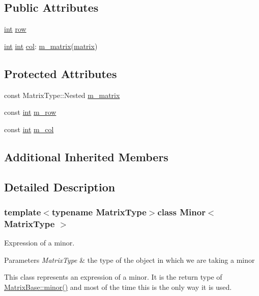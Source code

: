 \subsection*{Public Attributes}
\begin{DoxyCompactItemize}
\item 
\hyperlink{ioapi_8h_a787fa3cf048117ba7123753c1e74fcd6}{int} \hyperlink{class_minor_aed84dc350a249af6b212117b823c59df}{row}
\item 
\hyperlink{ioapi_8h_a787fa3cf048117ba7123753c1e74fcd6}{int} \hyperlink{ioapi_8h_a787fa3cf048117ba7123753c1e74fcd6}{int} \hyperlink{class_minor_abbdcf722ac69ca909b979719d920a0c3}{col}\-: \hyperlink{class_minor_a0da370e5ee24eafe1fff3fb1703ab1bb}{m\-\_\-matrix}(\hyperlink{glext_8h_a7b24a3f2f56eb1244ae69dacb4fecb6f}{matrix})
\end{DoxyCompactItemize}
\subsection*{Protected Attributes}
\begin{DoxyCompactItemize}
\item 
const Matrix\-Type\-::\-Nested \hyperlink{class_minor_a0da370e5ee24eafe1fff3fb1703ab1bb}{m\-\_\-matrix}
\item 
const \hyperlink{ioapi_8h_a787fa3cf048117ba7123753c1e74fcd6}{int} \hyperlink{class_minor_af1cc8170a50e957e93d3f7c1fb8cfe00}{m\-\_\-row}
\item 
const \hyperlink{ioapi_8h_a787fa3cf048117ba7123753c1e74fcd6}{int} \hyperlink{class_minor_acd8dab2dc2aca39dbf33f73d91c1f59c}{m\-\_\-col}
\end{DoxyCompactItemize}
\subsection*{Additional Inherited Members}


\subsection{Detailed Description}
\subsubsection*{template$<$typename Matrix\-Type$>$class Minor$<$ Matrix\-Type $>$}

Expression of a minor. 


\begin{DoxyParams}{Parameters}
{\em Matrix\-Type} & the type of the object in which we are taking a minor\\
\hline
\end{DoxyParams}
This class represents an expression of a minor. It is the return type of \hyperlink{class_matrix_base_a768e8e9fae4b01bf336274f4a07c9459}{Matrix\-Base\-::minor()} and most of the time this is the only way it is used.

